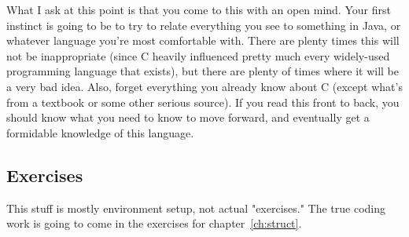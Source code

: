 \documentclass[ebook,11pt,oneside,openany]{memoir}
\begin{document}
What I ask at this point is that you come to this with an open mind. Your first instinct is going to be to try to relate everything you see to something in Java, or whatever language you're most comfortable with. There are plenty times this will not be inappropriate (since C heavily influenced pretty much every widely-used programming language that exists), but there are plenty of times where it will be a very bad idea. Also, forget everything you already know about C (except what's from a textbook or some other serious source). If you read this front to back, you should know what you need to know to move forward, and eventually get a formidable knowledge of this language.

\subsection{Exercises}

This stuff is mostly environment setup, not actual "exercises." The true coding work is going to come in the exercises for chapter~\ref{ch:struct}.
\end{document}
